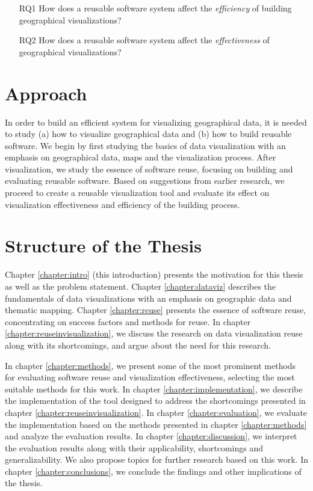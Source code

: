 \begin{enumerate}
	\item[RQ1] How does a reusable software system affect the \emph{efficiency} of building geographical visualizations?
	\item[RQ2] How does a reusable software system affect the \emph{effectiveness} of geographical visualizations?
\end{enumerate}



\section{Approach}

In order to build an efficient system for visualizing geographical data, it is needed to study (a) how to visualize geographical data and (b) how to build reusable software. We begin by first studying the basics of data visualization with an emphasis on geographical data, maps and the visualization process. After visualization, we study the essence of software reuse, focusing on building and evaluating reusable software. Based on suggestions from earlier research, we proceed to create a reusable visualization tool and evaluate its effect on visualization effectiveness and efficiency of the building process.

\section{Structure of the Thesis}
\label{section:structure} 

Chapter \ref{chapter:intro} (this introduction) presents the motivation for this thesis as well as the problem statement. Chapter \ref{chapter:dataviz} describes the fundamentals of data visualizations with an emphasis on geographic data and thematic mapping. Chapter \ref{chapter:reuse} presents the essence of software reuse, concentrating on success factors and methods for reuse. In chapter \ref{chapter:reuseinvisualization}, we discuss the research on data visualization reuse along with its shortcomings, and argue about the need for this research.

In chapter \ref{chapter:methods}, we present some of the most prominent methods for evaluating software reuse and visualization effectiveness, selecting the most suitable methods for this work. In chapter \ref{chapter:implementation}, we describe the implementation of the tool designed to address the shortcomings presented in chapter \ref{chapter:reuseinvisualization}. In chapter \ref{chapter:evaluation}, we evaluate the implementation based on the methods presented in chapter \ref{chapter:methods} and analyze the evaluation results. In chapter \ref{chapter:discussion}, we interpret the evaluation results along with their applicability, shortcomings and generalizability. We also propose topics for further research based on this work. In chapter \ref{chapter:conclusions}, we conclude the findings and other implications of the thesis.